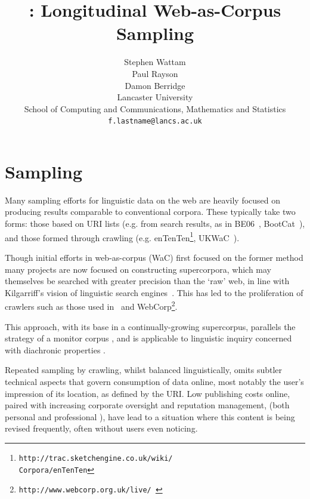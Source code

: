 \documentclass[11pt]{article}
\title{\toolname: Longitudinal Web-as-Corpus Sampling}
\author{Stephen Wattam\superscript{1}\\\And
  Paul Rayson\superscript{1}\\\And
  Damon Berridge\superscript{2}\\\AND
  Lancaster University\\
  School of Computing and Communications\superscript{1}, Mathematics and Statistics\superscript{2}\\
  {\tt f.lastname@lancs.ac.uk}\\
}
\date{}
\newcommand{\citefn}[1]{\footnote{#1}}
\begin{document}
\maketitle

\section{Sampling}

Many sampling efforts for linguistic data on the web are heavily focused on producing results comparable to conventional corpora.  These typically take two forms: those based on URI lists (e.g. from search results, as in %
BE06~\cite{baker2009be06}, BootCat~\cite{baroni2004bootcat}), and those formed through crawling (e.g. enTenTen\citefn{\texttt{http://trac.sketchengine.co.uk/wiki/\\Corpora/enTenTen}}, %
UKWaC~\cite{ferraresi2008introducing}).

Though initial efforts in web-as-corpus (WaC) first focused on the former method %
many projects are now focused on constructing supercorpora, which may themselves be searched with greater precision than the `raw' web, in line with Kilgarriff's vision of linguistic search engines~\cite{kilgarriff2003linguistic}.  This has led to the proliferation of crawlers such as those used in~\cite{schafer8building} and WebCorp\citefn{\texttt{http://www.webcorp.org.uk/live/
}}.%


This approach, with its base in a continually-growing supercorpus, parallels the strategy of a monitor corpus%
, and is applicable to linguistic inquiry concerned with diachronic properties%
.


Repeated sampling by crawling, whilst balanced linguistically, omits subtler technical aspects that govern consumption of data online, most notably the user's impression of its location, as defined by the URI.  Low publishing costs online, paired with increasing corporate oversight and reputation management, (both personal %
and professional%
), have lead to a situation where this content is being revised frequently, often without users even noticing.
\end{document}
